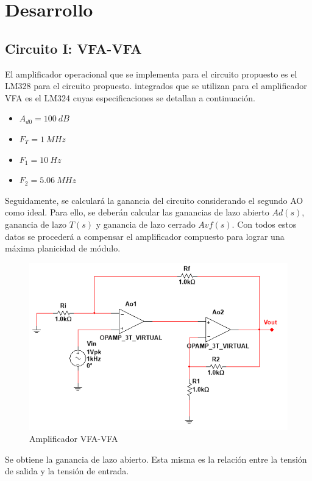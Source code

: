 \section{Desarrollo}
\subsection{Circuito I: VFA-VFA}
\hspace{1mm} El amplificador operacional que se implementa para el circuito propuesto es el LM328 para el circuito propuesto.  integrados que se utilizan para el amplificador VFA es el LM324 cuyas especificaciones se detallan a continuación.

\begin{itemize}
    \item \(A_{d0}=100~dB\)
    \item \(F_T=1~MHz\)
    \item \(F_1=10~Hz\)
    \item \(F_2=5.06~MHz\)
\end{itemize}

\bigskip
\hspace{1mm} Seguidamente, se calculará la ganancia del circuito considerando el segundo AO como ideal. Para ello, se deberán calcular las ganancias de lazo abierto \(Ad(s)\), ganancia de lazo \(T(s)\) y ganancia de lazo cerrado \(Avf(s)\). Con todos estos datos se procederá a compensar el amplificador compuesto para lograr una máxima planicidad de módulo.

\begin{figure}[H]
    \centering
    \includegraphics[width=0.7\linewidth]{VFA-VFA-Circuito.png}
    \caption{Amplificador VFA-VFA}
    \label{fig:enter-label}
\end{figure}

\hspace{1mm} Se obtiene la ganancia de lazo abierto. Esta misma es la relación entre la tensión de salida y la tensión de entrada.

